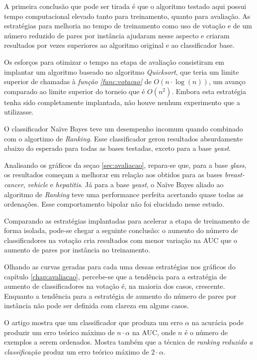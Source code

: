 A primeira conclusão que pode ser tirada é que o algoritmo testado aqui possui tempo computacional elevado tanto para treinamento, quanto para avaliação. As estratégias para melhoria no tempo de treinamento como uso de votação e de um número reduzido de pares por instância ajudaram nesse aspecto e criaram resultados por vezes superiores ao algoritmo original e ao classificador base.

Os esforços para otimizar o tempo na etapa de avaliação consistiram em implantar um algoritmo baseado no algoritmo \emph{Quicksort}, que teria um limite superior de chamadas à \emph{função \ref{func:votacao}} de $O(n \cdot \log(n))$, um avanço comparado ao limite superior do torneio que é $O(n^2)$. Embora esta estratégia tenha sido completamente implantada, não houve nenhum experimento que a utilizasse.

O classificador Naïve Bayes teve um desempenho incomum quando combinado com o algortimo de \emph{Ranking}. Esse classificador gerou resultados absurdamente abaixo do esperado para todas as bases testadas, exceto para a base \emph{yeast}.

Analisando os gráficos da seçao \ref{sec:avaliacao}, repara-se que, para a base \emph{glass}, os resultados começam a melhorar em relação aos obtidos para as bases \emph{breast-cancer}, \emph{vehicle} e \emph{hepatitis}. Já para a base \emph{yeast}, o Naïve Bayes aliado ao algoritmo de \emph{Ranking} teve uma performance perfeita acertando quase todas as ordenações. Esse comportamento bipolar não foi elucidado nesse estudo.

Comparando as estratégias implantadas para acelerar a etapa de treinamento de forma isolada, pode-se chegar a seguinte conclusão: o aumento do número de classificadores na votação cria resultados com menor variação na AUC que o aumento de pares por instância no treinamento.

Olhando as curvas geradas para cada uma dessas estratégias nos gráficos do capítulo \ref{chap:avaliacao}, percebe-se que a tendência para a estratégia de aumento de classificadores na votação é, na maioria dos casos, crescente. Enquanto a tendência para a estratégia de aumento do número de pares por instância não pode ser definida com clareza em alguns casos.

O artigo \cite{langford08} mostra que um classificador que produza um erro $\alpha$ na acurácia pode produzir um erro teórico máximo de $n \cdot \alpha$ na AUC, onde $n$ é o número de exemplos a serem ordenados. Mostra também que a técnica de \emph{ranking reduzido a classificação} produz um erro teórico máximo de $2 \cdot \alpha$.

